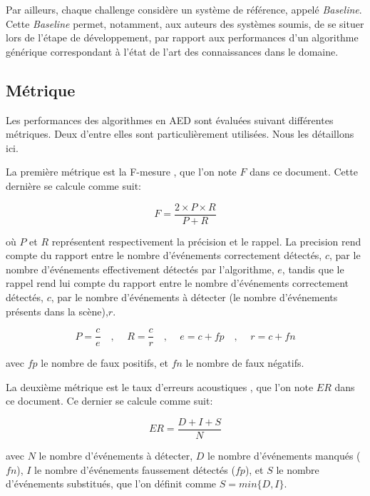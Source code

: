 Par ailleurs, chaque challenge considère un système de référence, appelé \emph{Baseline}. Cette \emph{Baseline} permet, notamment, aux auteurs des systèmes soumis, de se situer lors de l'étape de développement, par rapport aux performances d'un algorithme générique correspondant à l'état de l'art des connaissances dans le domaine.

\subsection{Métrique}
\label{sec:ch6_metriqueAED}

Les performances des algorithmes en AED sont évaluées suivant différentes métriques. Deux d'entre elles sont particulièrement utilisées. Nous les détaillons ici.

La première métrique est la F-mesure \citep{Giannoulis2013database,giannoulis2013detection,Stowell15}, que l'on note $F$ dans ce document. Cette dernière se calcule comme suit:

\begin{equation}
F=\dfrac{2\times P \times R}{P+R}
\end{equation}

où $P$ et $R$ représentent respectivement la précision et le rappel. La precision rend compte du rapport entre le nombre d'événements correctement détectés, $c$, par le nombre d'événements effectivement détectés par l'algorithme, $e$, tandis que le rappel rend lui compte du rapport entre le nombre d'événements correctement détectés, $c$, par le nombre d'événements à détecter (le nombre d'événements présents dans la scène),$r$.

\begin{equation}
P=\dfrac{c}{e}  \quad \textrm{, } \quad R=\dfrac{c}{r} \quad \textrm{, } \quad  e=c+fp \quad \textrm{, } \quad  r=c+fn
\end{equation}

avec $fp$ le nombre de faux positifs, et $fn$ le nombre de faux négatifs.

La deuxième métrique est le taux d'erreurs acoustiques \citep{poliner2007discriminative,clear}, que l'on note $ER$ dans ce document. Ce dernier se calcule comme suit:

\begin{equation}
ER=\dfrac{D+I+S}{N}
\end{equation}

avec $N$ le nombre d'événements à détecter, $D$ le nombre d'événements manqués ($fn$), $I$ le nombre d'événements faussement détectés ($fp$), et $S$ le nombre d'événements substitués, que l'on définit comme $S=min\lbrace D,I\rbrace$.

